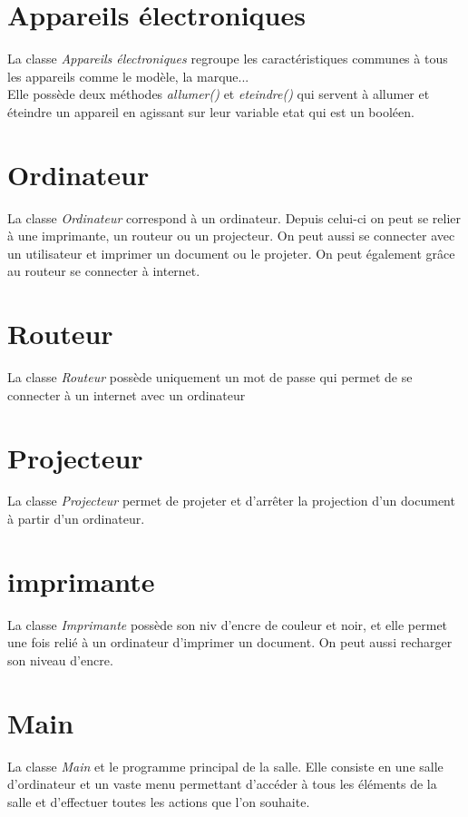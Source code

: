 \documentclass[12,french]{report}
\begin{document}
\section{Appareils électroniques}

La classe \textit{Appareils électroniques} regroupe les caractéristiques communes à tous les appareils comme le modèle, la marque...\\
Elle possède deux méthodes \textit{allumer()} et \textit{eteindre()} qui servent à allumer et éteindre un appareil en agissant sur leur variable etat qui est un booléen.

\section{Ordinateur}

La classe \textit{Ordinateur} correspond à un ordinateur. Depuis celui-ci on peut se relier à une imprimante, un routeur ou un projecteur. On peut aussi se connecter avec un utilisateur et imprimer un document ou le projeter. On peut également grâce au routeur se connecter à internet.

\section{Routeur}

La classe \textit{Routeur} possède uniquement un mot de passe qui permet de se connecter à un internet avec un ordinateur

\section{Projecteur}

La classe \textit{Projecteur} permet de projeter et d'arrêter la projection d'un document à partir d'un ordinateur.

\section{imprimante}

La classe \textit{Imprimante} possède son niv d'encre de couleur et noir, et elle permet une fois relié à un ordinateur d'imprimer un document. On peut aussi recharger son niveau d'encre.

\section{Main}

La classe \textit{Main} et le programme principal de la salle. Elle consiste en une salle d'ordinateur et un vaste menu permettant d'accéder à tous les éléments de la salle et d'effectuer toutes les actions que l'on souhaite.
\end{document}
